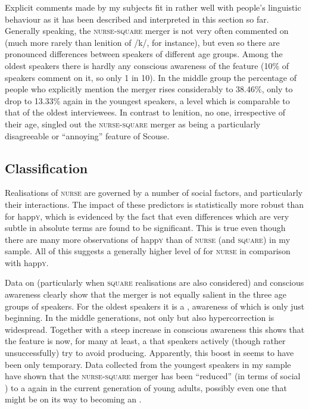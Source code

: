 Explicit comments made by my subjects fit in rather well with people's linguistic behaviour as it has been described and interpreted in this section so far.
Generally speaking, the \textsc{nurse}-\textsc{square} merger is not very often commented on (much more rarely than lenition of /k/, for instance), but even so there are pronounced differences between speakers of different age groups.
Among the oldest speakers there is hardly any conscious awareness of the feature (10\% of speakers comment on it, so only 1 in 10).
In the middle group the percentage of people who explicitly mention the merger rises considerably to 38.46\%, only to drop to 13.33\% again in the youngest speakers, a level which is comparable to that of the oldest interviewees.
In contrast to lenition, no one, irrespective of their age, singled out the \textsc{nurse}-\textsc{square} merger as being a particularly disagreeable or ``annoying'' feature of Scouse.

\subsection{Classification}

Realisations of \textsc{nurse} are governed by a number of social factors, and particularly their interactions.
The impact of these predictors is statistically more robust than for happ\textsc{y}, which is evidenced by the fact that even differences which are very subtle in absolute terms are found to be significant.
This is true even though there are many more observations of happ\textsc{y} than of \textsc{nurse} (and \textsc{square}) in my sample.
All of this suggests a generally higher level of  for \textsc{nurse} in comparison with happ\textsc{y}.

Data on  (particularly when \textsc{square} realisations are also considered) and conscious awareness clearly show that the merger is not equally salient in the three age groups of speakers.
For the oldest speakers it is a , awareness of which is only just beginning.
In the middle generations, not only  but also hypercorrection is widespread.
Together with a steep increase in conscious awareness this shows that the feature is now, for many at least, a  that speakers actively (though rather unsuccessfully) try to avoid producing.
Apparently, this boost in  seems to have been only temporary.
Data collected from the youngest speakers in my sample have shown that the \textsc{nurse}-\textsc{square} merger has been ``reduced'' (in terms of social ) to a  again in the current generation of young adults, possibly even one that might be on its way to becoming an .

